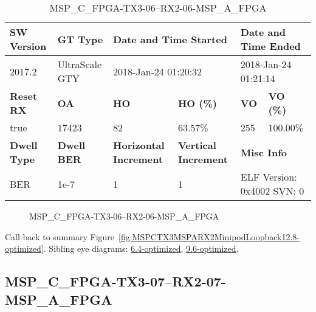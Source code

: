 \begin{table}[h]
\centering
\caption{MSP\_C\_FPGA-TX3-06--RX2-06-MSP\_A\_FPGA}
\label{tab:MSPCFPGATX306RX206MSPAFPGA12.8-optimized}
\begin{tabular}{@{}|l|l|l|l|l|l|@{}}
\toprule
\textbf{SW Version}                & \textbf{GT Type}   & \multicolumn{2}{l|}{\textbf{Date and Time Started}}            & \multicolumn{2}{l|}{\textbf{Date and Time Ended}}        \\ \midrule
2017.2                       & UltraScale GTY          & \multicolumn{2}{l|}{2018-Jan-24 01:20:32}                   & \multicolumn{2}{l|}{2018-Jan-24 01:21:14}               \\ \midrule
\textbf{Reset RX}                  & \textbf{OA} & \textbf{HO}   & \textbf{HO (\%)} & \textbf{VO} & \textbf{VO (\%)} \\ \midrule
true & 17423        & 82          & 63.57\%        & 255        & 100.00\%       \\ \midrule
\textbf{Dwell Type}                & \textbf{Dwell BER} & \textbf{Horizontal Increment} & \textbf{Vertical Increment}    & \multicolumn{2}{l|}{\textbf{Misc Info}}                  \\ \midrule
BER                            & 1e-7        & 1        & 1           & \multicolumn{2}{l|}{ELF Version: 0x4002 SVN: 0}                         \\ \bottomrule
\end{tabular}
\end{table}

\begin{figure}[h]
\caption{MSP\_C\_FPGA-TX3-06--RX2-06-MSP\_A\_FPGA} \label{fig:MSPCFPGATX306RX206MSPAFPGA12.8-optimized}
\end{figure}

Call back to summary Figure~\ref{fig:MSPCTX3MSPARX2MinipodLoopback12.8-optimized}.
Sibling eye diagrams: \hyperref[sec:MSPCFPGATX306RX206MSPAFPGA6.4-optimized]{6.4-optimized}, \hyperref[sec:MSPCFPGATX306RX206MSPAFPGA9.6-optimized]{9.6-optimized}.

\clearpage
\newpage


\subsection{MSP\_C\_FPGA-TX3-07--RX2-07-MSP\_A\_FPGA}\label{sec:MSPCFPGATX307RX207MSPAFPGA12.8-optimized}

